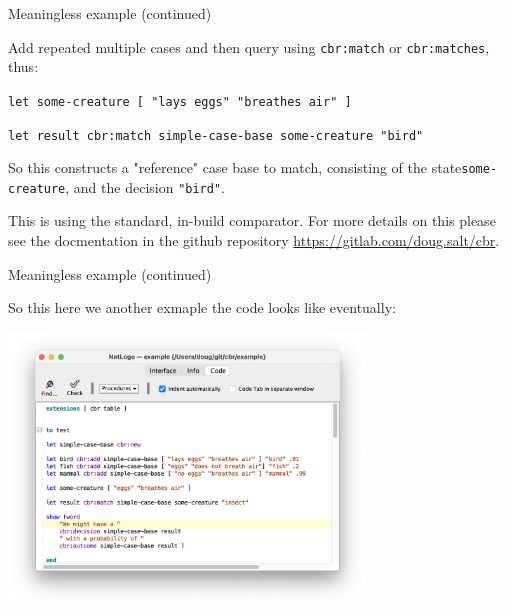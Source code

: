 \documentclass[usenames,dvipsnames,10pt]{beamer} %
\begin{document}
\begin{frame}{Meaningless example (continued)}

    Add repeated multiple cases and then query using \texttt{{\color{blue}cbr:match}} or  \texttt{{\color{blue}cbr:matches}}, thus:

    \vspace{0.5cm}
    \small

    \texttt{let some-creature [ {\color{red}"lays eggs" "breathes air"} ]}

    \texttt{let result {\color{blue}cbr:match} simple-case-base some-creature {\color{red}"bird"}}

    \vspace{0.5cm}

    \normalsize
    So this constructs a "reference" case base to match, consisting of the state\texttt{some-creature}, and the decision \texttt{\color{red}"bird"}.

    \vspace{0.25cm}
    This is using the standard, in-build comparator. For more details on this please see the docmentation in the github repository \url{https://gitlab.com/doug.salt/cbr}.

\end{frame}

\begin{frame}{Meaningless example (continued)}

    So this here we another exmaple the code looks like eventually:

    \includegraphics[width=9.5cm]{img/simple-example-code.png}

\end{frame}
\end{document}
